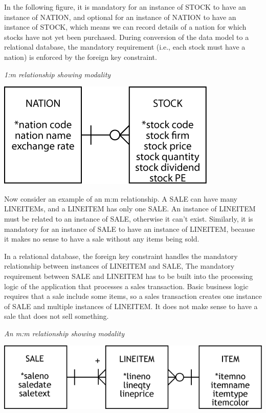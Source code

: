 \documentclass[
]{article}
\begin{document}
In the following figure, it is mandatory for an instance of STOCK to
have an instance of NATION, and optional for an instance of NATION to
have an instance of STOCK, which means we can record details of a nation
for which stocks have not yet been purchased. During conversion of the
data model to a relational database, the mandatory requirement (i.e.,
each stock must have a nation) is enforced by the foreign key
constraint.

\emph{1:m relationship showing modality}

\includegraphics{Figures/Chapter 7/nation-stock-modal.png}

Now consider an example of an m:m relationship. A SALE can have many
LINEITEMs, and a LINEITEM has only one SALE. An instance of LINEITEM
must be related to an instance of SALE, otherwise it can't exist.
Similarly, it is mandatory for an instance of SALE to have an instance
of LINEITEM, because it makes no sense to have a sale without any items
being sold.

In a relational database, the foreign key constraint handles the
mandatory relationship between instances of LINEITEM and SALE, The
mandatory requirement between SALE and LINEITEM has to be built into the
processing logic of the application that processes a sales transaction.
Basic business logic requires that a sale include some items, so a sales
transaction creates one instance of SALE and multiple instances of
LINEITEM. It does not make sense to have a sale that does not sell
something.

\emph{An m:m relationship showing modality}

\includegraphics{Figures/Chapter 7/m-and-m-modality.png}
\end{document}
